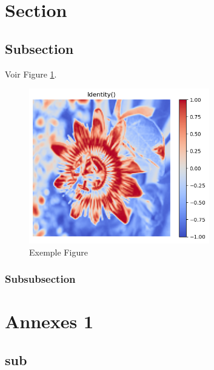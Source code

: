 \documentclass[UTF8,a4paper,12pt]{ctexart}
\begin{document}
\section{Section}
\lipsum[6]\cite{dupont2023}
\subsection{Subsection}
\lipsum[8] Voir Figure \ref{Fig1}.

\begin{figure}[h]
\centering
\includegraphics[width=0.7\textwidth]{figure1.png}
\caption{Exemple Figure}
\label{Fig1}
\end{figure}

\subsubsection{Subsubsection}
\lipsum[9]

\newpage

\newpage
\appendix
\section{Annexes 1}
\lipsum[2]
\subsection{sub}
\lipsum[1]
\end{document}
